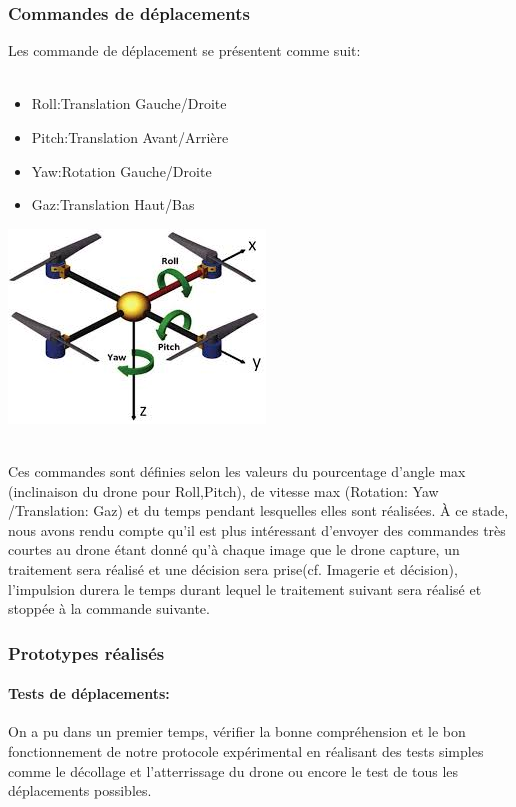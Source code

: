 \documentclass[12pt]{article}
\begin{document}
\subsubsection{Commandes de déplacements}
Les commande de déplacement se présentent comme suit:\\~\\
\begin{minipage}{.5\linewidth}
\begin{itemize}
    \item Roll:Translation Gauche/Droite
    \item Pitch:Translation Avant/Arrière
    \item Yaw:Rotation Gauche/Droite
    \item Gaz:Translation Haut/Bas\\
\end{itemize}
\end{minipage}
\hfill
\begin{minipage}{.5\linewidth}
\centering
\includegraphics[width=.5\linewidth]{index.jpeg}
\end{minipage}
\\
Ces commandes sont définies selon les valeurs du pourcentage d'angle max (inclinaison du drone pour Roll,Pitch), de vitesse max (Rotation: Yaw /Translation: Gaz) et du temps pendant lesquelles elles sont réalisées. À ce stade, nous avons rendu compte qu'il est plus intéressant d'envoyer des commandes très courtes au drone étant donné qu'à chaque image que le drone capture, un traitement sera réalisé et une décision sera prise(cf. Imagerie et décision), l'impulsion durera le temps durant lequel le traitement suivant sera réalisé et stoppée à la commande suivante.

\subsubsection{Prototypes réalisés\label{protor}}
\paragraph*{Tests de déplacements:}
On a pu dans un premier temps, vérifier la bonne compréhension et le bon fonctionnement de notre protocole expérimental en réalisant des tests simples comme le décollage et l'atterrissage du drone ou encore le test de tous les déplacements possibles.
\end{document}

